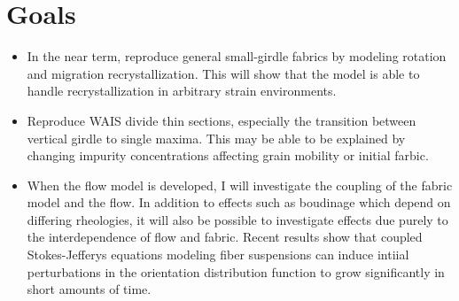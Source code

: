 \documentclass{article}
\begin{document}
\section{Goals}
\begin{itemize}
\item In the near term, reproduce general small-girdle fabrics by modeling rotation and migration recrystallization. This will show that the model is able to handle recrystallization in arbitrary strain environments.

\item Reproduce WAIS divide thin sections, especially the transition between vertical girdle to single maxima. This may be able to be explained by changing impurity concentrations affecting grain mobility or initial farbic.

\item When the flow model is developed, I will investigate the coupling of the fabric model and the flow. In addition to effects such as boudinage which depend on differing rheologies, it will also be possible to investigate effects due purely to the interdependence of flow and fabric. Recent results \citep{montgomery-smith2011} show that coupled Stokes-Jefferys equations modeling fiber suspensions can induce intiial perturbations in the orientation distribution function to grow significantly in short amounts of time.

\end{itemize}


\end{document}

